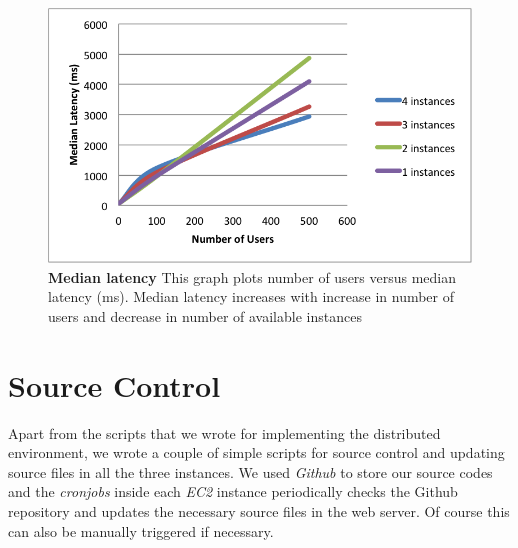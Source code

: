 \documentclass[12pt]{article}
\begin{document}
\begin{figure}[H] 
\centering
\includegraphics[scale=0.75]{Images/median_latency.PNG} 
\caption{\textbf{Median
latency} This graph plots number of users versus median latency (ms). Median latency 
increases with increase in number of users and decrease in number of available instances} 
\label{fig:median_latency} 
\end{figure}

\section{Source Control} 
Apart from the scripts that we wrote for implementing the distributed environment, 
we wrote a couple of simple scripts for source control and updating source files in all the three
instances. We used \emph{Github} \cite{github} to store our source codes and the
\emph{cronjobs} inside each \emph{EC2} instance periodically checks the {Github}
repository and updates the necessary source files in the web server. Of course
this can also be manually triggered if necessary.
\end{document}

